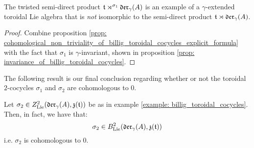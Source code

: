         \begin{corollary}
            The twisted semi-direct product $\mathfrak{t} \rtimes^{\sigma_1} \mathfrak{der}_{\gamma}(A)$ is an example of a $\gamma$-extended toroidal Lie algebra that is \textit{not} isomorphic to the semi-direct product $\mathfrak{t} \rtimes \mathfrak{der}_{\gamma}(A)$.
        \end{corollary}
            \begin{proof}
                Combine proposition \ref{prop: cohomological_non_triviality_of_billig_toroidal_cocycles_explicit_formula} with the fact that $\sigma_1$ is $\gamma$-invariant, shown in proposition \ref{prop: invariance_of_billig_toroidal_cocycles}.
            \end{proof}

        The following result is our final conclusion regarding whether or not the toroidal $2$-cocycles $\sigma_1$ and $\sigma_2$ are cohomologous to $0$.
        \begin{proposition} \label{prop: cohomological_non_triviality_of_billig_toroidal_cocycles}
            Let $\sigma_2 \in Z^2_{\mathrm{Lie}}(\mathfrak{der}_{\gamma}(A), \mathfrak{z}(\mathfrak{t}) )$ be as in example \ref{example: billig_toroidal_cocycles}. Then, in fact, we have that:
                $$\sigma_2 \in B^2_{\mathrm{Lie}}(\mathfrak{der}_{\gamma}(A), \mathfrak{z}(\mathfrak{t}))$$
            i.e. $\sigma_2$ is cohomologous to $0$.
        \end{proposition}

